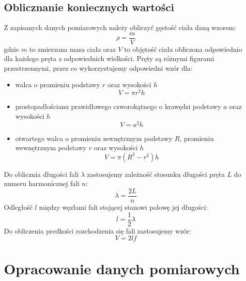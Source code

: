 \documentclass[a4paper,12pts]{article}
\begin{document}
\newpage
\subsection{Oblicznanie koniecznych wartości}
Z zapisanych danych pomiarowych należy obliczyć gęstość ciała daną wzorem:
\begin{equation}
\rho = \frac{m}{V}
\end{equation}
gdzie $m$ to zmierzona masa ciała oraz $V$ to objętość ciała obliczona odpowiednio dla każdego pręta z odpowiednich wielkości. Pręty są różnymi figurami przestrzennymi, przez co wykorzystujemy odpowiedni wzór dla:
\begin{itemize}
	\item walca o promieniu podstawy $r$ oraz wysokości $h$
	\begin{equation}
	V = \pi r^2 h
	\end{equation}
	
	\item prostopadłościanu prawidłowego czworokątnego o krawędzi podstawy $a$ oraz wysokości $h$
	\begin{equation}
	V = a^2 h
	\end{equation}
	
	\item otwartego walca o promieniu zewnętrznym podstawy $R$, promieniu wewnętrznym podstawy $r$ oraz wysokości $h$
	\begin{equation}
	V = \pi (R^2 - r^2) h
	\end{equation}
\end{itemize}
Do oblicznia długości fali $\lambda$ zastosujemy zależność stosunku długości pręta $L$ do numeru harmonicznej fali $n$:
\begin{equation}
\lambda = \frac{2L}{n}
\end{equation}
Odległość $l$ między węzłami fali stojącej stanowi połowę jej długości:
\begin{equation}
l = \frac{1}{2} \lambda
\end{equation}
Do obliczenia predkości rozchodzenia się fali zastosujemy wzór:
\begin{equation}
V = 2lf
\end{equation}
\newpage
	
	\section{Opracowanie danych pomiarowych}
	
\end{document}
